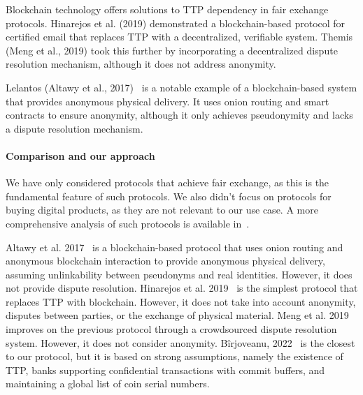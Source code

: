 \documentclass[pdftex,twocolumn,epjc3]{svjour3}
\providecommand{\DIFaddbegin}{} %
\providecommand{\DIFaddend}{} %
\newcommand{\DIFaddincludegraphics}[2][]{{\color{blue}\fbox{\DIFOincludegraphics[#1]{#2}}}} %
\DeclareRobustCommand{\DIFaddbegin}{\DIFOaddbegin \let\includegraphics\DIFaddincludegraphics} %
\DeclareRobustCommand{\DIFaddend}{\DIFOaddend \let\includegraphics\DIFOincludegraphics} %
\begin{document}
Blockchain technology offers solutions to TTP dependency in fair exchange protocols. Hinarejos et al. (2019)\cite{hinarejosSolutionSecureCertified2019} demonstrated a blockchain-based protocol for certified email that replaces TTP with a decentralized, verifiable system. Themis (Meng et al., 2019)\cite{mengThemisDecentralizedEscrow2019} took this further by incorporating a decentralized dispute resolution mechanism, although it does not address anonymity.

Lelantos (Altawy et al., 2017)~\cite{altawyLelantosBlockchainBasedAnonymous2017} is a notable example of a blockchain-based system that provides anonymous physical delivery. It uses onion routing and smart contracts to ensure anonymity, although it only achieves pseudonymity and lacks a dispute resolution mechanism.

\paragraph{Comparison and our approach}

\begin{sloppypar}
We have only considered protocols that achieve fair exchange, as this is the fundamental feature of such protocols.
We also didn't focus on protocols for buying digital products, as they are not relevant to our use case. A more comprehensive analysis of such protocols is available in~\cite{birjoveanuTwoPartyECommerceProtocols2022}.
\end{sloppypar}

\DIFaddbegin \begin{sloppypar}
\DIFaddend Altawy et al. 2017~\cite{altawyLelantosBlockchainBasedAnonymous2017} is a blockchain-based protocol that uses onion routing and anonymous blockchain interaction to provide anonymous physical delivery, assuming unlinkability between pseudonyms and real identities. However, it does not provide dispute resolution.
Hinarejos et al. 2019~\cite{hinarejosSolutionSecureCertified2019} is the simplest protocol that replaces TTP with blockchain. However, it does not take into account anonymity, disputes between parties, or the exchange of physical material.
Meng et al. 2019~\cite{mengThemisDecentralizedEscrow2019} improves on the previous protocol through a crowdsourced dispute resolution system. However, it does not consider anonymity.
Bîrjoveanu, 2022~\cite{birjoveanuTwoPartyECommerceProtocols2022} is the closest to our protocol, but it is based on strong assumptions, namely the existence of TTP, banks supporting confidential transactions with commit buffers, and maintaining a global list of coin serial numbers.
\DIFaddbegin \end{sloppypar}
\DIFaddend 
\end{document}
